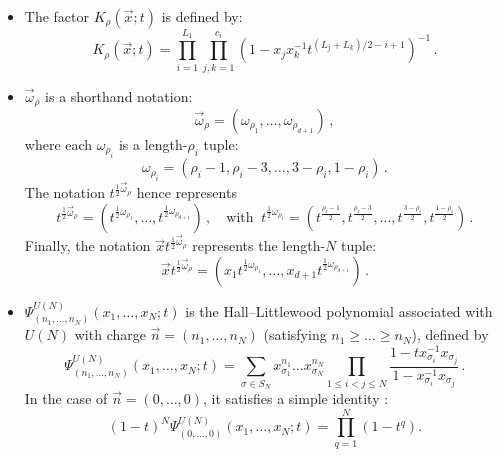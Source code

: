 \documentclass[12pt,a4paper]{article}
\begin{document}
\begin{itemize}
\item The factor $K_\rho(\vec{x};t)$ is defined by:
 \begin{equation}
 K_\rho(\vec{x};t)
 =\prod_{i=1}^{L_1}\prod_{j,k=1}^{c_i}
 \left(1-x_jx_k^{-1}
 t^{(L_j+L_k)/2-i+1}\right)^{-1}\,.
 \label{eq:chmz-k}
\end{equation}

\item $\vec{\omega}_\rho$ is a shorthand notation:
\begin{equation}
    \vec{\omega}_\rho=(\omega_{\rho_1},\dots,\omega_{\rho_{d+1}})\,,
\end{equation}
where each $\omega_{\rho_i}$ is a length-$\rho_i$ tuple:
\begin{equation}
    \omega_{\rho_i}=(\rho_i-1,\rho_i-3,\dots,3-\rho_i,1-\rho_i)\,.
\end{equation}
The notation $t^{\frac{1}{2}\vec{\omega}_\rho}$ hence represents 
\begin{equation}
    t^{\frac{1}{2}\vec{\omega}_\rho}=(t^{\frac{1}{2}\omega_{\rho_1}},\dots,t^{\frac{1}{2}\omega_{\rho_{d+1}}})\,,\quad \text{with }\  t^{\frac{1}{2}\omega_{\rho_i}}=(t^{\frac{\rho_i-1}{2}},t^{\frac{\rho_i-3}{2}},\dots,t^{\frac{3-\rho_i}{2}},t^{\frac{1-\rho_i}{2}})\,.
\end{equation}
Finally, the notation $\vec{x}t^{\frac{1}{2}\vec{\omega}_\rho}$ represents the length-$N$ tuple:
\begin{equation}
    \vec{x}t^{\frac{1}{2}\vec{\omega}_\rho}=(x_1t^{\frac{1}{2}\omega_{\rho_1}},\dots,x_{d+1}t^{\frac{1}{2}\omega_{\rho_{d+1}}})\,.
\end{equation}
\item $\Psi^{U(N)}_{(n_1,\ldots,n_N)}(x_1,\dots,x_N;t)$ is the Hall--Littlewood polynomial associated with $U(N)$ with charge $\vec n=(n_1,\ldots,n_N)$ (satisfying $n_1\geq\dots\geq n_N$), defined by
\begin{equation}
    \Psi^{U(N)}_{(n_1,\ldots,n_N)}(x_1,\dots,x_N;t)=\sum_{\sigma\in S_N}x_{\sigma_1}^{n_1}\dots x_{\sigma_N}^{n_N}\prod_{1\leq i<j\leq N}\frac{1-tx_{\sigma_i}^{-1}x_{\sigma_j}}{1-x_{\sigma_i}^{-1}x_{\sigma_j}}\,.
\end{equation}
In the case of $\vec n=(0,\dots,0)$, it satisfies a simple identity \cite{CremonesiEtAl2014}:
\begin{equation}
 (1-t)^N\Psi^{U(N)}_{(0,\ldots,0)}(x_1,\dots,x_N;t)
 =\prod_{q=1}^{N}(1-t^q).
 \label{eq:chmz-zero-hl}
\end{equation}
\end{itemize}
\end{document}
